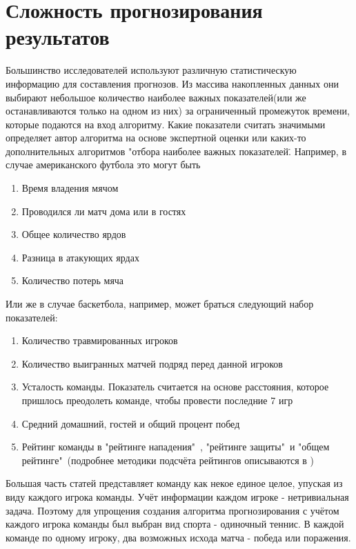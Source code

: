 \section{Сложность прогнозирования результатов}
 Большинство исследователей используют различную статистическую информацию для составления прогнозов. Из массива накопленных данных они выбирают небольшое количество наиболее важных показателей(или же останавливаются только на одном из них) за ограниченный промежуток времени, которые подаются на вход алгоритму.
 Какие показатели считать значимыми определяет автор алгоритма на основе экспертной оценки или каких-то дополнительных алгоритмов "отбора наиболее важных показателей\".
 Например, в случае американского футбола\cite{Book02} это могут быть
 \begin{enumerate}
 	\item Время владения мячом
 	\item Проводился ли матч дома или в гостях
 	\item Общее количество ярдов
 	\item Разница в атакующих ярдах
 	\item Количество потерь мяча
 \end{enumerate}
Или же в случае баскетбола, например, может браться следующий набор показателей:
 \begin{enumerate}
	\item  Количество травмированных игроков
	\item Количество выигранных матчей подряд перед данной игроков
	\item Усталость команды. Показатель считается на основе расстояния, которое пришлось преодолеть команде, чтобы провести последние 7 игр
	\item Средний домашний, гостей и общий процент побед
	\item Рейтинг команды в "рейтинге нападения"\ , "рейтинге защиты"\ и "общем рейтинге"\ (подробнее методики подсчёта рейтингов описываются в \cite{Book03})
\end{enumerate}
Большая часть статей представляет команду как некое единое целое, упуская из виду каждого игрока команды. Учёт информации каждом игроке - нетривиальная задача.
Поэтому для упрощения создания алгоритма прогнозирования с учётом каждого игрока команды был выбран вид спорта - одиночный теннис. В каждой команде по одному игроку, два возможных исхода матча - победа или поражения.
